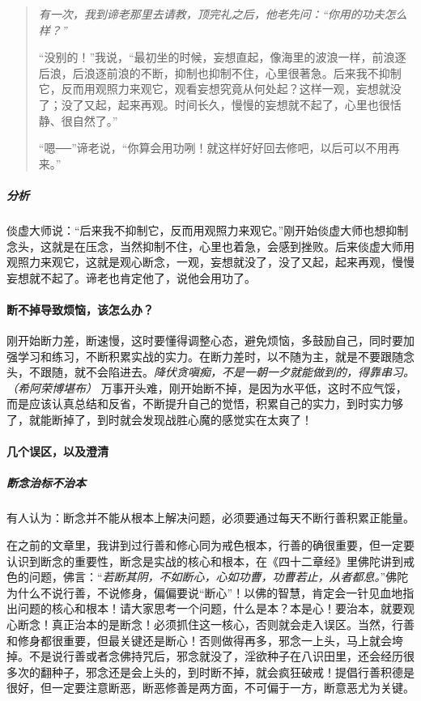 \begin{quotation}\it
    有一次，我到谛老那里去请教，顶完礼之后，他老先问：“你用的功夫怎么样？”

    “没别的！”我说，“最初坐的时候，妄想直起，像海里的波浪一样，前浪逐后浪，后浪逐前浪的不断，抑制也抑制不住，心里很著急。后来我不抑制它，反而用观照力来观它，观看妄想究竟从何处起？这样一观，妄想就没了；没了又起，起来再观。时间长久，慢慢的妄想就不起了，心里也很恬静、很自然了。”

    “嗯──”谛老说，“你算会用功咧！就这样好好回去修吧，以后可以不用再来。”
\end{quotation}

\subparagraph{分析} 倓虚大师说：“后来我不抑制它，反而用观照力来观它。”刚开始倓虚大师也想抑制念头，这就是在压念，当然抑制不住，心里也着急，会感到挫败。后来倓虚大师用观照力来观它，这就是观心断念，一观，妄想就没了，没了又起，起来再观，慢慢妄想就不起了。谛老也肯定他了，说他会用功了。

\paragraph{断不掉导致烦恼，该怎么办？}

刚开始断力差，断速慢，这时要懂得调整心态，避免烦恼，多鼓励自己，同时要加强学习和练习，不断积累实战的实力。在断力差时，以不随为主，就是不要跟随念头，不跟随，就不会陷进去。\textit{降伏贪嗔痴，不是一朝一夕就能做到的，得靠串习。（希阿荣博堪布）} 万事开头难，刚开始断不掉，是因为水平低，这时不应气馁，而是应该认真总结和反省，不断提升自己的觉悟，积累自己的实力，到时实力够了，就能断掉了，到时就会发现战胜心魔的感觉实在太爽了！

\paragraph{几个误区，以及澄清}

\subparagraph{断念治标不治本}

有人认为：断念并不能从根本上解决问题，必须要通过每天不断行善积累正能量。

在之前的文章里，我讲到过行善和修心同为戒色根本，行善的确很重要，但一定要认识到断念的重要性，断念是实战的核心和根本，在《四十二章经》里佛陀讲到戒色的问题，佛言：“\textit{若断其阴，不如断心，心如功曹，功曹若止，从者都息。}”佛陀为什么不说行善，不说修身，偏偏要说“断心”！以佛的智慧，肯定会一针见血地指出问题的核心和根本！请大家思考一个问题，什么是本？本是心！要治本，就要观心断念！真正治本的是断念！必须抓住这一核心，否则就会走入误区。当然，行善和修身都很重要，但最关键还是断心！否则做得再多，邪念一上头，马上就会垮掉。不是说行善或者念佛持咒后，邪念就没了，淫欲种子在八识田里，还会经历很多次的翻种子，邪念还是会上头的，到时断不掉，就会疯狂破戒！提倡行善积德是很好，但一定要注意断恶，断恶修善是两方面，不可偏于一方，断意恶尤为关键。

